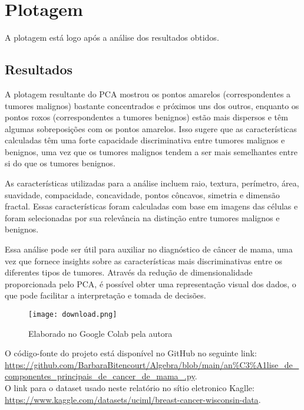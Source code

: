 \documentclass{article}
\begin{document}
\section{Plotagem}
A plotagem está logo após a análise dos resultados obtidos. 

\subsection{Resultados}

A plotagem resultante do PCA mostrou os pontos amarelos (correspondentes a tumores malignos) bastante concentrados e próximos uns dos outros, enquanto os pontos roxos (correspondentes a tumores benignos) estão mais dispersos e têm algumas sobreposições com os pontos amarelos. Isso sugere que as características calculadas têm uma forte capacidade discriminativa entre tumores malignos e benignos, uma vez que os tumores malignos tendem a ser mais semelhantes entre si do que os tumores benignos.

As características utilizadas para a análise incluem raio, textura, perímetro, área, suavidade, compacidade, concavidade, pontos côncavos, simetria e dimensão fractal. Essas características foram calculadas com base em imagens das células e foram selecionadas por sua relevância na distinção entre tumores malignos e benignos.

Essa análise pode ser útil para auxiliar no diagnóstico de câncer de mama, uma vez que fornece insights sobre as características mais discriminativas entre os diferentes tipos de tumores. Através da redução de dimensionalidade proporcionada pelo PCA, é possível obter uma representação visual dos dados, o que pode facilitar a interpretação e tomada de decisões.




\begin{figure}
\centering
\texttt{[image: download.png]}
\caption{\label{fig:frog}Elaborado no Google Colab pela autora}
\end{figure} 




O código-fonte do projeto está disponível no GitHub no seguinte link:\\ \url{https://github.com/BarbaraBitencourt/Algebra/blob/main/an%C3%A1lise_de_componentes_principais_de_cancer_de_mama_.py}.\\
O link para o dataset usado neste relatório no sítio eletronico Kaglle:\\ \url{https://www.kaggle.com/datasets/uciml/breast-cancer-wisconsin-data}.
\end{document}
